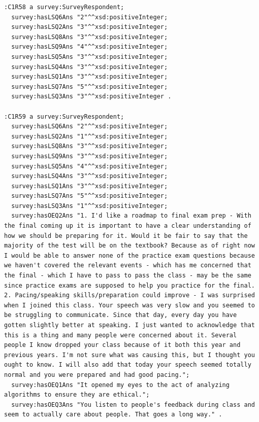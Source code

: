 \begin{lstlisting}
:C1R58 a survey:SurveyRespondent;
  survey:hasLSQ6Ans "2"^^xsd:positiveInteger;
  survey:hasLSQ2Ans "3"^^xsd:positiveInteger;
  survey:hasLSQ8Ans "3"^^xsd:positiveInteger;
  survey:hasLSQ9Ans "4"^^xsd:positiveInteger;
  survey:hasLSQ5Ans "3"^^xsd:positiveInteger;
  survey:hasLSQ4Ans "3"^^xsd:positiveInteger;
  survey:hasLSQ1Ans "3"^^xsd:positiveInteger;
  survey:hasLSQ7Ans "5"^^xsd:positiveInteger;
  survey:hasLSQ3Ans "3"^^xsd:positiveInteger .

:C1R59 a survey:SurveyRespondent;
  survey:hasLSQ6Ans "2"^^xsd:positiveInteger;
  survey:hasLSQ2Ans "1"^^xsd:positiveInteger;
  survey:hasLSQ8Ans "3"^^xsd:positiveInteger;
  survey:hasLSQ9Ans "3"^^xsd:positiveInteger;
  survey:hasLSQ5Ans "4"^^xsd:positiveInteger;
  survey:hasLSQ4Ans "3"^^xsd:positiveInteger;
  survey:hasLSQ1Ans "3"^^xsd:positiveInteger;
  survey:hasLSQ7Ans "5"^^xsd:positiveInteger;
  survey:hasLSQ3Ans "1"^^xsd:positiveInteger;
  survey:hasOEQ2Ans "1. I'd like a roadmap to final exam prep - With the final coming up it is important to have a clear understanding of how we should be preparing for it. Would it be fair to say that the majority of the test will be on the textbook? Because as of right now I would be able to answer none of the practice exam questions because we haven't covered the relevant events - which has me concerned that the final - which I have to pass to pass the class - may be the same since practice exams are supposed to help you practice for the final. 2. Pacing/speaking skills/preparation could improve - I was surprised when I joined this class. Your speech was very slow and you seemed to be struggling to communicate. Since that day, every day you have gotten slightly better at speaking. I just wanted to acknowledge that this is a thing and many people were concerned about it. Several people I know dropped your class because of it both this year and previous years. I'm not sure what was causing this, but I thought you ought to know. I will also add that today your speech seemed totally normal and you were prepared and had good pacing.";
  survey:hasOEQ1Ans "It opened my eyes to the act of analyzing algorithms to ensure they are ethical.";
  survey:hasOEQ3Ans "You listen to people's feedback during class and seem to actually care about people. That goes a long way." .

\end{lstlisting}

